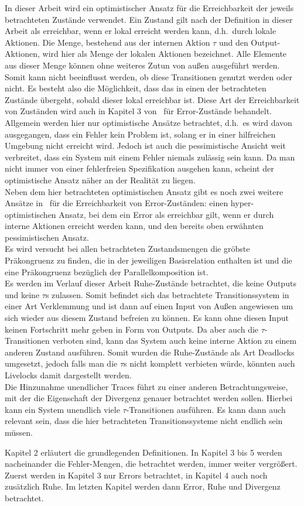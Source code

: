 In dieser Arbeit wird ein optimistischer Ansatz für die Erreichbarkeit
der jeweils betrachteten Zustände verwendet. Ein Zustand gilt nach der Definition in dieser
Arbeit als erreichbar, wenn er lokal erreicht
werden kann, d.h.\ durch lokale Aktionen. Die Menge, bestehend aus der internen
Aktion $\tau$ und den Output-Aktionen, wird hier als Menge der lokalen Aktionen
bezeichnet.
Alle Elemente aus dieser Menge können ohne weiteres Zutun von außen ausgeführt
werden. Somit kann nicht beeinflusst werden, ob diese Transitionen genutzt
werden oder nicht. Es besteht also die Möglichkeit, dass das \EIO{} in einen
der betrachteten Zustände übergeht, sobald dieser lokal erreichbar ist. Diese Art der
Erreichbarkeit von Zuständen wird auch in Kapitel 3 von~\cite{Vogler2014EIO}
für Error-Zustände behandelt.\\
Allgemein werden hier nur optimistische Ansätze betrachtet, d.h.\ es wird davon
ausgegangen, dass ein Fehler kein Problem ist, solang er in einer hilfreichen
Umgebung nicht erreicht wird. Jedoch ist auch die pessimistische Ansicht weit
verbreitet, dass ein System mit einem Fehler niemals zulässig sein kann. Da man
nicht immer von einer fehlerfreien Spezifikation ausgehen kann, scheint der
optimistische Ansatz näher an der Realität zu liegen.\\
Neben dem hier betrachteten optimistischen Ansatz gibt es noch zwei weitere
Ansätze in~\cite{Vogler2014EIO} für die Erreichbarkeit von Error-Zuständen:
einen hyper-optimistischen Ansatz, bei dem ein Error als erreichbar gilt, wenn
er durch interne Aktionen erreicht werden kann, und den bereits oben erwähnten
pessimistischen Ansatz.\\
Es wird versucht bei allen betrachteten Zustandsmengen die gröbste Präkongruenz zu
finden, die in der jeweiligen Basisrelation enthalten ist und die eine
Präkongruenz bezüglich der Parallelkomposition ist.\\
Es werden im Verlauf dieser Arbeit Ruhe-Zustände betrachtet, die keine Outputs
und keine $\tau$s zulassen. Somit befindet sich das betrachtete
Transitionssystem in einer Art Verklemmung und ist dann auf einen Input von
Außen angewiesen um sich wieder aus diesem Zustand befreien zu können. Es kann
ohne diesen Input keinen Fortschritt mehr geben in Form von Outputs. Da aber
auch die $\tau$-Transitionen verboten sind, kann das System auch keine interne
Aktion zu einem anderen Zustand
ausführen. Somit wurden die Ruhe-Zustände als Art Deadlocks umgesetzt,
jedoch falls man die $\tau$s nicht komplett verbieten würde, könnten auch
Livelocks damit dargestellt werden.\\
Die Hinzunahme unendlicher Traces führt zu einer anderen Betrachtungsweise, mit
der die Eigenschaft der Divergenz genauer betrachtet werden sollen. Hierbei
kann ein System unendlich viele $\tau$-Transitionen ausführen. Es kann dann
auch relevant sein, dass die hier betrachteten Transitionssysteme nicht endlich sein
müssen.

Kapitel 2 erläutert die grundlegenden Definitionen. In Kapitel 3 bis 5 werden
nacheinander die Fehler-Mengen, die betrachtet werden, immer weiter vergrößert.
Zuerst werden in Kapitel 3 nur Errors betrachtet, in Kapitel 4 auch noch
zusätzlich Ruhe. Im letzten Kapitel werden dann Error, Ruhe und Divergenz
betrachtet.
